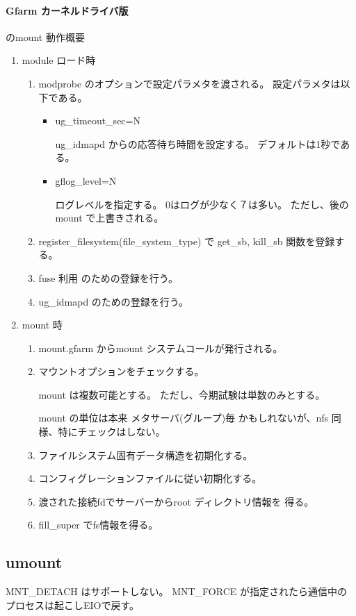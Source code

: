 \paragraph{Gfarm カーネルドライバ版} のmount 動作概要
	\begin{enumerate}
	\item	module ロード時	\par
		\begin{enumerate}
		\item	modprobe のオプションで設定パラメタを渡される。
			設定パラメタは以下である。
			\begin{itemize}
			\item ug_timeout_sec=N	\par
				ug_idmapd からの応答待ち時間を設定する。
				デフォルトは1秒である。
			\item gflog_level=N	\par
				ログレベルを指定する。
				0はログが少なく７は多い。
				ただし、後のmount で上書きされる。
			\end{itemize}
		\item	register_filesystem(file_system_type) で
			get_sb, kill_sb 関数を登録する。
		\item	fuse 利用 のための登録を行う。
		\item	ug_idmapd のための登録を行う。
		\end{enumerate}
	\item	mount 時
		\begin{enumerate}
		\item	mount.gfarm からmount システムコールが発行される。
		\item	マウントオプションをチェックする。	\par
		
			mount は複数可能とする。
			ただし、今期試験は単数のみとする。

			mount の単位は本来 メタサーバ(グループ)毎
			かもしれないが、nfs 同様、特にチェックはしない。
			
		\item	ファイルシステム固有データ構造を初期化する。
		\item	コンフィグレーションファイルに従い初期化する。
		\item	渡された接続fdでサーバーからroot ディレクトリ情報を
			得る。
		\item	fill_super でfs情報を得る。
		\end{enumerate}
	\end{enumerate}


\subsection{umount}
	MNT_DETACH はサポートしない。
	MNT_FORCE が指定されたら通信中のプロセスは起こしEIOで戻す。

